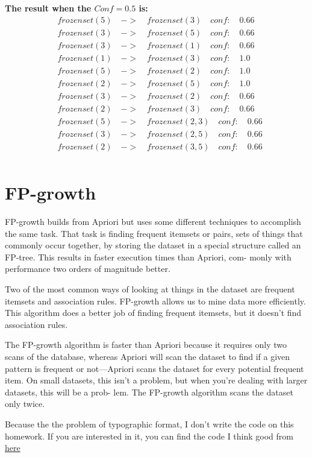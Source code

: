 \documentclass[letterpaper, 10 pt, conference]{ieeeconf}
\begin{document}
\textbf{The result when the $Conf = 0.5$ is:}
\begin{align*}
& frozenset({5}) \quad -> \quad frozenset({3}) \quad conf:\quad 0.66 \\
& frozenset({3}) \quad -> \quad frozenset({5}) \quad conf:\quad  0.66 \\
& frozenset({3}) \quad -> \quad frozenset({1}) \quad conf: \quad 0.66 \\
& frozenset({1}) \quad -> \quad frozenset({3}) \quad conf: \quad 1.0 \\
& frozenset({5}) \quad -> \quad frozenset({2}) \quad conf: \quad 1.0 \\
& frozenset({2}) \quad -> \quad frozenset({5}) \quad conf: \quad 1.0 \\
& frozenset({3}) \quad -> \quad frozenset({2}) \quad conf:\quad  0.66 \\
& frozenset({2}) \quad -> \quad frozenset({3}) \quad conf:\quad  0.66 \\
& frozenset({5}) \quad -> \quad frozenset({2, 3}) \quad conf:\quad  0.66\\
& frozenset({3}) \quad -> \quad frozenset({2, 5}) \quad conf:\quad  0.66 \\
& frozenset({2}) \quad -> \quad frozenset({3, 5}) \quad conf:\quad  0.66 \\
\end{align*}

\section{FP-growth}

FP-growth builds from Apriori but uses some different techniques to accomplish the same task. That task is finding frequent itemsets or pairs, sets of things that commonly occur together, by storing the dataset in a special structure called an FP-tree. This results in faster execution times than Apriori, com- monly with performance two orders of magnitude better.

Two of the most common ways of looking at things in the dataset are frequent itemsets and association rules. FP-growth allows us to mine data more efficiently. This algorithm does a better job of finding frequent itemsets, but it doesn’t find association rules.

The FP-growth algorithm is faster than Apriori because it requires only two scans of the database, whereas Apriori will scan the dataset to find if a given pattern is frequent or not—Apriori scans the dataset for every potential frequent item. On small datasets, this isn’t a problem, but when you’re dealing with larger datasets, this will be a prob- lem. The FP-growth algorithm scans the dataset only twice. 

Because the the problem of typographic format, I don't write the code on this homework. If you are interested in it, you can find the code I think good from \href{https://www.ibm.com/developerworks/cn/analytics/library/machine-learning-hands-on2-fp-growth/index.html}{here}
\end{document}
